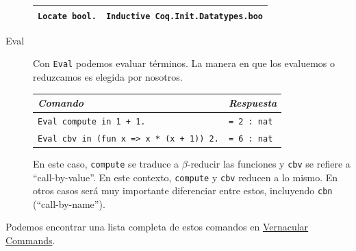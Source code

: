 \begin{description}
\begin{center}
\begin{tabular}{| l | l |}
  \hline
  \texttt{Locate bool.} & \texttt{Inductive Coq.Init.Datatypes.boo} \\
  \hline
  \end{tabular}
  \end{center}
  \item[Eval] Con \texttt{Eval} podemos evaluar términos. La manera en que los evaluemos o reduzcamos es elegida por nosotros.
  \begin{center}
  \begin{tabular}{| l | l |}
  \hline
  \emph{Comando} & \emph{Respuesta} \\
  \hline
  \texttt{Eval compute in 1 + 1.} & \texttt{= 2 : nat} \\
  \texttt{Eval cbv in (fun x => x * (x + 1)) 2.} & \texttt{= 6 : nat} \\
  \hline
  \end{tabular}
  \end{center}
  En este caso, \texttt{compute} se traduce a $\beta$-reducir las funciones y \texttt{cbv} se refiere a ``call-by-value''. En este contexto, \texttt{compute} y \texttt{cbv} reducen a lo mismo. En otros casos será muy importante diferenciar entre estos, incluyendo \texttt{cbn} (``call-by-name'').
\end{description}

Podemos encontrar una lista completa de estos comandos en \href{https://coq.inria.fr/refman/proof-engine/vernacular-commands.html}{Vernacular Commands}.
